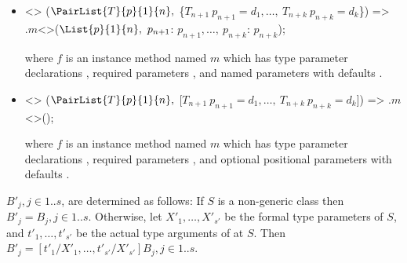\documentclass[makeidx]{article}
\begin{document}
{\begin{itemize}
\item
\begin{normativeDartCode}
<>
($\PairList{T}{p}{1}{n},\ $\{$T_{n+1}\ p_{n+1} = d_1, \ldots,\ T_{n+k}\ p_{n+k} = d_k$\}) =>
\quad\SUPER$.m$<>($\List{p}{1}{n},\ p_{n+1}$: $p_{n+1}, \ldots,\ p_{n+k}$: $p_{n+k}$);
\end{normativeDartCode}
where $f$ is an instance method named $m$
which has type parameter declarations
\TypeParametersStd,
required parameters ,
and named parameters  with defaults .
\item
\begin{normativeDartCode}
<>
($\PairList{T}{p}{1}{n},\ $[$T_{n+1}\ p_{n+1} = d_1, \ldots,\ T_{n+k}\ p_{n+k} = d_k$]) =>
\quad\SUPER.$m$<>();
\end{normativeDartCode}
where $f$ is an instance method named $m$
which has type parameter declarations
\TypeParametersStd,
required parameters ,
and optional positional parameters
 with defaults .
\end{itemize}


\LMHash{}%
$B'_j, j \in 1 .. s$, are determined as follows:
If $S$ is a non-generic class then $B'_j = B_j, j \in 1 .. s$.
Otherwise, let $X'_1, \ldots, X'_{s'}$ be the formal type parameters of $S$,
and $t'_1, \ldots, t'_{s'}$ be the actual type arguments of \THIS{} at $S$.
Then $B'_j = [t'_1/X'_1, \ldots, t'_{s'}/X'_{s'}]B_j, j \in 1 .. s$.


}
\end{document}
